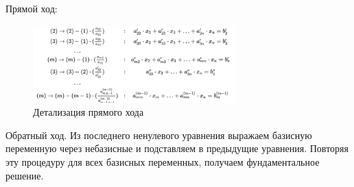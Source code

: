\documentclass[a4paper,12pt]{article}
\begin{document}
Прямой ход:

\begin{figure}[H]
\centering
\includegraphics[width=0.7\textwidth]{image2.png}
\caption{Детализация прямого хода}
\end{figure}

Обратный ход. Из последнего ненулевого уравнения выражаем базисную переменную через небазисные и подставляем в предыдущие уравнения. Повторяя эту процедуру для всех базисных переменных, получаем фундаментальное решение.
\end{document}
